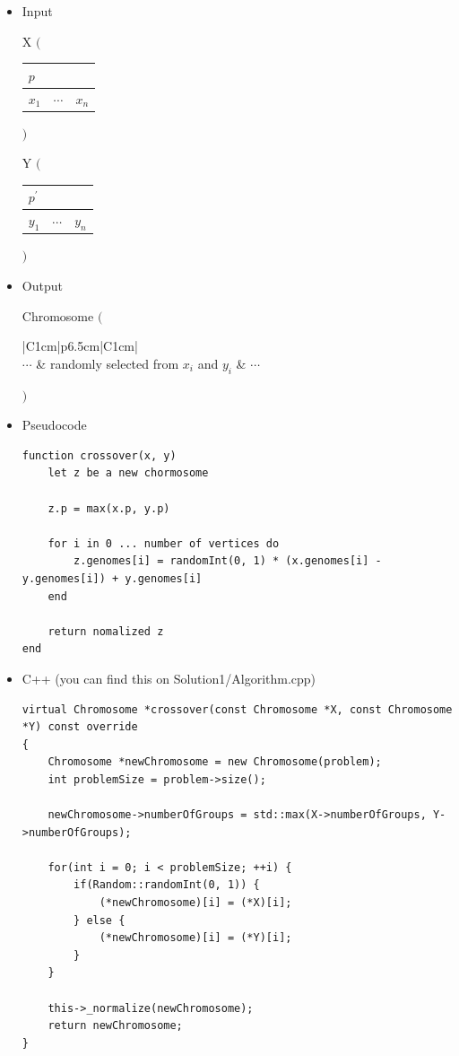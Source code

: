 \documentclass{article}
\newcommand{\textbigl}[1]{$\Bigg#1$\nobreak}
\newcommand{\textbigr}[1]{\nobreak$\Bigg#1$}
\begin{document}
\begin{itemize}
\item Input

X
\textbigl(
\begin{tabular}{|c|c|c|}
\hline
\multicolumn{3}{|l|}{$p$} \\\hline
$x_1$ & $\cdots$ & $x_n$\\\hline
\end{tabular}
\textbigr)

Y
\textbigl(
\begin{tabular}{|c|c|c|}
\hline
\multicolumn{3}{|l|}{$p^\prime$} \\\hline
$y_1$ & $\cdots$ & $y_n$\\\hline
\end{tabular}
\textbigr)

\item Output

Chromosome
\textbigl(
\begin{tabular}{|C{1cm}|p{6.5cm}|C{1cm}|}
\hline
{} \\\hline
$\cdots$ & randomly selected from $x_i$ and $y_i$ & $\cdots$ \\\hline
\end{tabular}
\textbigr)

\item Pseudocode
\begin{lstlisting}[style=lua]
function crossover(x, y)
	let z be a new chormosome 

	z.p = max(x.p, y.p)

	for i in 0 ... number of vertices do
		z.genomes[i] = randomInt(0, 1) * (x.genomes[i] - y.genomes[i]) + y.genomes[i]
	end

	return nomalized z
end
\end{lstlisting}


\item C++ (you can find this on Solution1/Algorithm.cpp)
\begin{lstlisting}
virtual Chromosome *crossover(const Chromosome *X, const Chromosome *Y) const override
{
    Chromosome *newChromosome = new Chromosome(problem);
    int problemSize = problem->size();

    newChromosome->numberOfGroups = std::max(X->numberOfGroups, Y->numberOfGroups);

    for(int i = 0; i < problemSize; ++i) {
        if(Random::randomInt(0, 1)) {
            (*newChromosome)[i] = (*X)[i];
        } else {
            (*newChromosome)[i] = (*Y)[i];
        }
    }

    this->_normalize(newChromosome);
    return newChromosome;
}
\end{lstlisting}
\end{itemize}
\end{document}
